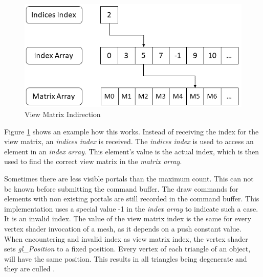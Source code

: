 \begin{figure}[h]
	\includegraphics[width=\linewidth]{images/viewmatrixindirection.png}
	\caption{View Matrix Indirection}
	\label{fig:viewmatrixindirection}
\end{figure}

Figure \ref{fig:viewmatrixindirection} shows an example how this works. Instead of receiving the index for the view matrix, an \textit{indices index} is received. The \textit{indices index} is used to access an element in an \textit{index array}. This element's value is the actual index, which is then used to find the correct view matrix in the \textit{matrix array}.

Sometimes there are less visible portals than the maximum count. This can not be known before submitting the command buffer. The draw commands for elements with non existing portals are still recorded in the command buffer. This implementation uses a special value -1 in the \textit{index array} to indicate such a case. It is an invalid index. The value of the view matrix index is the same for every vertex shader invocation of a mesh, as it depends on a push constant value. When encountering and invalid index as view matrix index, the vertex shader sets \textit{gl\_Position} to a fixed position. Every vertex of each triangle of an object, will have the same position. This results in all triangles being degenerate and they are culled \cite{khronos:vulkan:spec1.1}.

